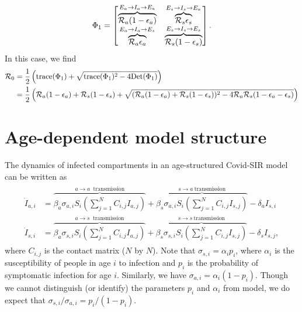 \documentclass[a4paper,12pt]{article}
\begin{document}
\begin{align}\label{eq: ngm - special-2}
\begin{split}
\Phi_{1} = \begin{bmatrix} 
\overbrace{\mathcal{R}_{a}(1 - \epsilon_{a})}^{E_{a} \rightarrow I_{a} \rightarrow E_{a}}&
\overbrace{\mathcal{R}_{s}\epsilon_{s}}^{E_{s} \rightarrow I_{s} \rightarrow E_{a}} \\
 \overbrace{\mathcal{R}_{a}\epsilon_{a}}^{E_{a} \rightarrow I_{a} \rightarrow E_{s}}&
\overbrace{\mathcal{R}_{s} (1 -\epsilon_{s})}^{E_{s} \rightarrow I_{s} \rightarrow E_{s}}
\end{bmatrix}.
\end{split}
\end{align}
In this case, we find 
\begin{align}\label{eq: R0 - special-2}
\begin{split}
\mathcal{R}_{0} &= \frac{1}{2}\left(\text{trace}(\Phi_{1}) + \sqrt{\text{trace}(\Phi_{1})^{2} - 4 \text{Det}(\Phi_{1})}\right)\\
&= \frac{1}{2}\left(\mathcal{R}_{a} (1 - \epsilon_{a}) + \mathcal{R}_{s} (1 - \epsilon_{s})  + \sqrt{(\mathcal{R}_{a} (1 - \epsilon_{a})  + \mathcal{R}_{s} (1 - \epsilon_{s}) )^{2} - 4\mathcal{R}_{a}\mathcal{R}_{s} (1 - \epsilon_{a} - \epsilon_{s}) }\right)
\end{split}
\end{align}

\section{Age-dependent model structure}
The dynamics of infected compartments in an age-structured Covid-SIR model can be written as 
\begin{align}\label{eq: age-model}
	\begin{split}
		\dot{I}_{a,i} &= \overbrace{\beta_{a}\sigma_{a, i}S_{i}\left(\sum_{j = 1}^{N} C_{i,j}I_{a,j}\right)}^{a \rightarrow a\ \text{ transmission}}+  \overbrace{\beta_{s}\sigma_{a, i}S_{i}\left(\sum_{j = 1}^{N} C_{i,j}I_{s,j}\right) }^{s \rightarrow a\ \text{transmission}} - \delta_{a}I_{s,i}\\
		\dot{I}_{s,i} &=\overbrace{\beta_{a}\sigma_{s, i}S_{i}\left(\sum_{j = 1}^{N} C_{i,j}I_{a,j}\right)}^{a \rightarrow s\ \text{ transmission}}+  \overbrace{\beta_{s}\sigma_{s, i}S_{i}\left(\sum_{j = 1}^{N} C_{i,j}I_{s,j}\right) }^{s \rightarrow s\ \text{transmission}} - \delta_{s}I_{s,j},
	\end{split}
\end{align}
where $C_{i,j}$ is the contact matrix ($N$ by $N$). Note that $\sigma_{s,i} = \alpha_{i}p_{i}$, where  $\alpha_{i}$ is the susceptibility of people in age $i$ to infection and $p_{i}$ is the probability of symptomatic infection for age $i$. Similarly, we have $\sigma_{a, i} = \alpha_{i}(1 - p_{i})$. Though we cannot distinguish (or identify) the parameters $p_{i}$ and $\alpha_{i}$ from model, we do expect that $\sigma_{s, i}/\sigma_{a, i} = p_{i}/(1 - p_{i})$. 
\end{document}
